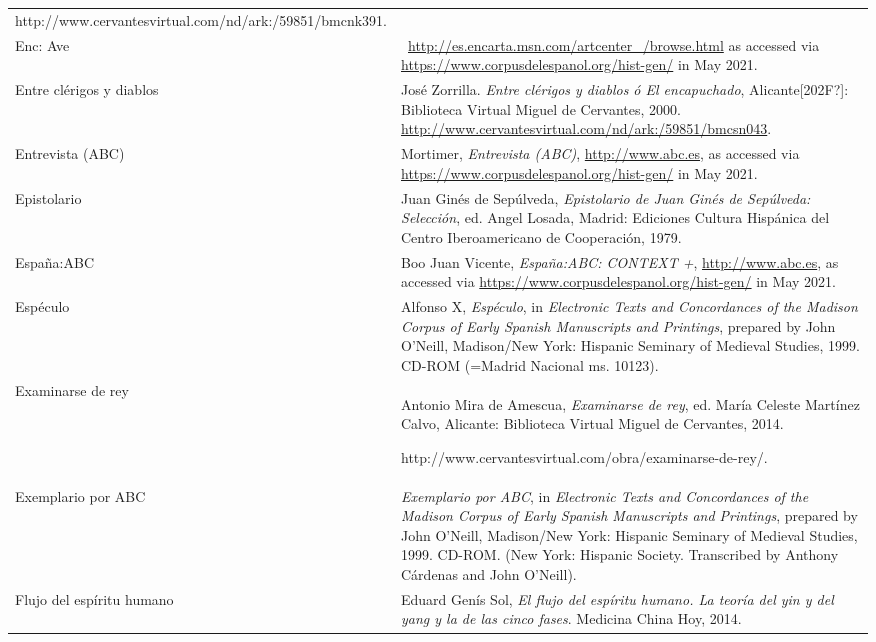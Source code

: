 \begin{flushleft}
\begin{supertabular}{m{1.7955599in}m{4.42126in}}
http://www.cervantesvirtual.com/nd/ark:/59851/bmcnk391.\\
Enc: Ave\textit{ } &
\ \url{http://es.encarta.msn.com/artcenter_/browse.html} as accessed via \url{https://www.corpusdelespanol.org/hist-gen/} in May 2021.\\
Entre clérigos y diablos  &
José Zorrilla. \textit{Entre clérigos y diablos ó El encapuchado}, Alicante[202F?]: Biblioteca Virtual Miguel de Cervantes, 2000. \url{http://www.cervantesvirtual.com/nd/ark:/59851/bmcsn043}.\\
Entrevista (ABC) &
Mortimer,\textit{ Entrevista (ABC)}, \url{http://www.abc.es}, as accessed via \url{https://www.corpusdelespanol.org/hist-gen/} in May 2021.\\
Epistolario  &
Juan Ginés de Sepúlveda, \textit{Epistolario de Juan Ginés de Sepúlveda: Selección}, ed. Angel Losada, Madrid: Ediciones Cultura Hispánica del Centro Iberoamericano de Cooperación, 1979.\\
España:ABC  &
Boo Juan Vicente,\textit{ España:ABC: CONTEXT +}, \url{http://www.abc.es}, as accessed via \url{https://www.corpusdelespanol.org/hist-gen/} in May 2021.\\
Espéculo  &
Alfonso X, \textit{Espéculo}, in \textit{Electronic Texts and Concordances of the Madison Corpus of Early Spanish Manuscripts and Printings},\textit{ }prepared by John O’Neill, Madison/New York: Hispanic Seminary of Medieval Studies, 1999. CD-ROM (=Madrid Nacional ms. 10123).\\
Examinarse de rey  &
Antonio Mira de Amescua, \textit{Examinarse de rey}, ed. María Celeste Martínez Calvo, Alicante: Biblioteca Virtual Miguel de Cervantes, 2014. 

http://www.cervantesvirtual.com/obra/examinarse-de-rey/.\\
Exemplario por ABC\textit{ \ } &
\textit{Exemplario por ABC}, in \textit{Electronic Texts and Concordances of the Madison Corpus of Early Spanish Manuscripts and Printings},\textit{ }prepared by John O’Neill, Madison/New York: Hispanic Seminary of Medieval Studies, 1999. CD-ROM. (New York: Hispanic Society. Transcribed by Anthony Cárdenas and John O'Neill).\\
Flujo del espíritu humano  &
Eduard Genís Sol, \textit{El flujo del espíritu humano. La teoría del yin y del yang y la de las cinco fases}. Medicina China Hoy, 2014.


\end{supertabular}
\end{flushleft}
